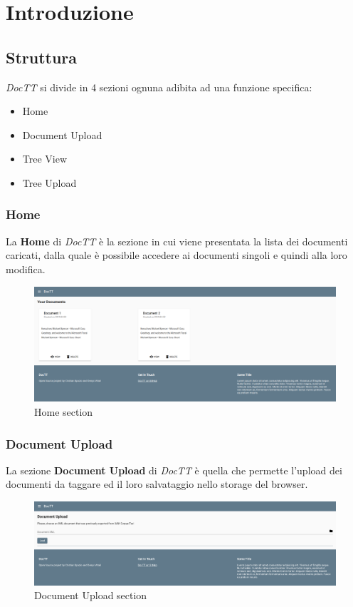 \documentclass[twoside]{supsistudent}
\begin{document}
\chapter{Introduzione}

\section{Struttura}

\textit{DocTT} si divide in 4 sezioni ognuna adibita ad una funzione specifica:
\begin{itemize}
  \item Home
  \item Document Upload
  \item Tree View
  \item Tree Upload
\end{itemize}

\subsection{Home}
La \textbf{Home} di \textit{DocTT} è la sezione in cui viene presentata la 
lista dei documenti caricati, dalla quale è possibile accedere ai documenti 
singoli e quindi alla loro modifica.

\begin{figure}[h!]
\includegraphics[width=\linewidth]{figures/home.png}
\caption{Home section}\label{fig:home}
\end{figure}

\pagebreak

\subsection{Document Upload}
La sezione \textbf{Document Upload} di \textit{DocTT} è quella che permette
l'upload dei documenti da taggare ed il loro salvataggio nello storage del 
browser.

\begin{figure}[h!]
  \includegraphics[width=\linewidth]{figures/docUpload.png}
  \caption{Document Upload section}\label{fig:docUpload}
\end{figure}
\end{document}
